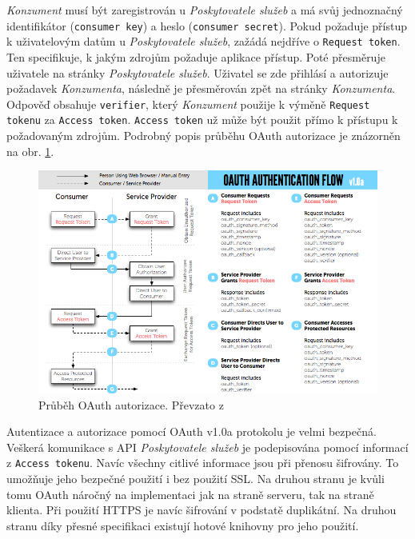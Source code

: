 \documentclass[thesis=M,czech]{FITthesis}[2014/05/6]
\begin{document}
\textit{Konzument} musí být zaregistrován u \textit{Poskytovatele služeb} a má svůj jednoznačný identifikátor (\texttt{consumer key}) a heslo (\texttt{consumer secret}).
Pokud požaduje přístup k uživatelovým datům u \textit{Poskytovatele služeb}, zažádá nejdříve o \texttt{Request token}. Ten specifikuje, k jakým zdrojům požaduje aplikace
přístup. Poté přesměruje uživatele na stránky \textit{Poskytovatele služeb}. Uživatel se zde přihlásí a autorizuje požadavek \textit{Konzumenta}, následně je přesměrován 
zpět na stránky \textit{Konzumenta}. Odpověď obsahuje \texttt{verifier}, který \textit{Konzument} použije k výměně \texttt{Request tokenu} za \texttt{Access token}. \texttt{Access token}
už může být použit přímo k přístupu k požadovaným zdrojům. Podrobný popis průběhu OAuth autorizace je znázorněn na obr. \ref{fig:auth-oauth1}.

\begin{figure}\centering
 	\includegraphics[width=1\textwidth]{images/diagram/auth_oauth1}
 	\caption[Průběh OAuth autorizace]{Průběh OAuth autorizace. Převzato z \cite{oauth:v1}}\label{fig:auth-oauth1}
\end{figure}

Autentizace a autorizace pomocí OAuth v1.0a protokolu je velmi bezpečná. Veškerá komunikace s API \textit{Poskytovatele služeb} je podepisována pomocí informací z 
\texttt{Access tokenu}. Navíc všechny citlivé informace jsou při přenosu šifrovány. To umožňuje jeho bezpečné použití i bez použití SSL. Na druhou stranu je kvůli tomu OAuth náročný na implementaci 
jak na straně serveru, tak na straně klienta. Při použití HTTPS je navíc šifrování v podstatě duplikátní. Na druhou stranu díky přesné specifikaci existují hotové knihovny pro jeho použití.
\end{document}
